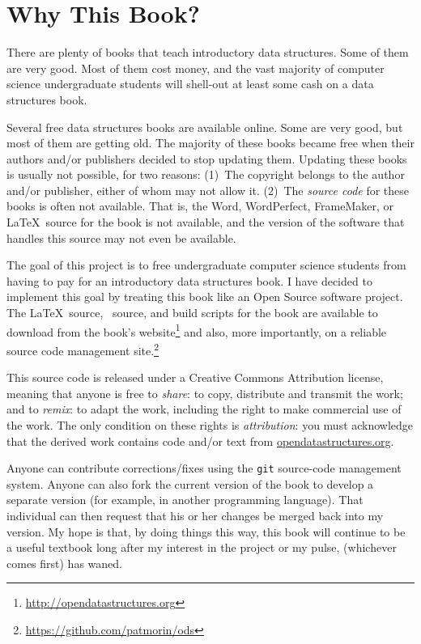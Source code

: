 \chapter*{Why This Book?}

There are plenty of books that teach introductory data structures.
Some of them are very good.  Most of them cost money, and the vast
majority of computer science undergraduate students will shell-out at
least some cash on a data structures book.

Several free data structures books are available online.  Some are very
good, but most of them are getting old.  The majority of these books
became free when their authors and/or publishers decided to stop updating
them.  Updating these books is usually not possible, for two reasons:
(1)~The copyright belongs to the author and/or publisher, either of whom
may not allow it.  (2)~The \emph{source code} for these books is often
not available.  That is, the Word, WordPerfect, FrameMaker, or \LaTeX\
source for the book is not available, and the version of the software
that handles this source may not even be available.

The goal of this project is to free undergraduate computer science
students from having to pay for an introductory data structures book.
I have decided to implement this goal by treating this book like an Open
Source software project.  The \LaTeX\ source, \lang\ source, and build
scripts for the book are available to download from the book's website\footnote{\url{http://opendatastructures.org}} and also, more importantly, on a reliable
source code management site.\footnote{\url{https://github.com/patmorin/ods}}

This source code is released under a Creative Commons Attribution license,
meaning that anyone is free to \emph{share}: to copy, distribute and
transmit the work; and to \emph{remix}: to adapt the work, including the
right to make commercial use of the work.  The only condition on these
rights is \emph{attribution}: you must acknowledge that the derived work
contains code and/or text from \url{opendatastructures.org}.

Anyone can contribute corrections/fixes using the \texttt{git} source-code
management system.  Anyone can also fork the current version of the
book to develop a separate version (for example, in another programming
language).  That individual can then request that his or her changes be
merged back into my version.  My hope is that, by doing things this way,
this book will continue to be a useful textbook long after my interest
in the project or my pulse, (whichever comes first) has waned.


